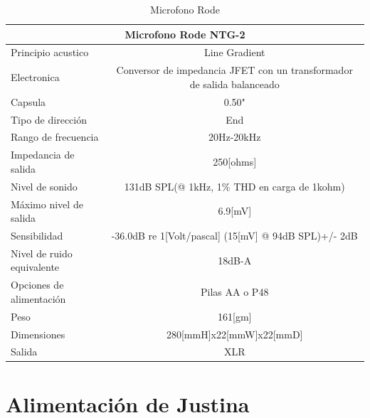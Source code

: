 \documentclass[user_manual.tex]{subfiles}
\begin{document}
\begin{minipage}{1\textwidth}
\begin{flushleft} %
\begin{table}[H]

\begin{tabular}{|l|l|}%

\hline
\multicolumn{2}{|c|}{Microfono Rode NTG-2} \\ \hline %
Principio acustico &  \multicolumn{1}{|c|}{Line Gradient}\\ \hline
Electronica & \multicolumn{1}{|c|}{Conversor de impedancia JFET con un transformador de salida balanceado}\\ \hline
Capsula & \multicolumn{1}{|c|}{0.50"}\\ \hline
Tipo de dirección & \multicolumn{1}{|c|}{End}\\ \hline
Rango de frecuencia & \multicolumn{1}{|c|}{20Hz-20kHz}\\ \hline
Impedancia de salida & \multicolumn{1}{|c|}{250[ohms]}\\ \hline
Nivel de sonido & \multicolumn{1}{|c|}{131dB SPL(@ 1kHz, 1\% THD en carga de 1kohm)}\\ \hline
Máximo nivel de salida & \multicolumn{1}{|c|}{6.9[mV]}\\ \hline
Sensibilidad & \multicolumn{1}{|c|}{-36.0dB re 1[Volt/pascal] (15[mV] @ 94dB SPL)+/- 2dB}\\ \hline
Nivel de ruido equivalente & \multicolumn{1}{|c|}{18dB-A}\\ \hline
Opciones de alimentación & \multicolumn{1}{|c|}{Pilas AA o P48}\\ \hline
Peso & \multicolumn{1}{|c|}{161[gm]}\\ \hline
Dimensiones & \multicolumn{1}{|c|}{280[mmH]x22[mmW]x22[mmD]}\\ \hline
Salida & \multicolumn{1}{|c|}{XLR}\\ \hline


\end{tabular}
\caption{Microfono Rode}
\label{Microfono Rode}

\end{table}

\end{flushleft}
\end{minipage}
\vfill

\section{Alimentación de Justina}
\end{document}
